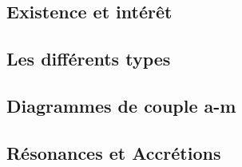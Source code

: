 \subsection{Existence et intérêt}
\subsection{Les différents types}\label{sec:CZ-types}
\subsection{Diagrammes de couple a-m}\label{sec:migrations-maps}
\subsection{Résonances et Accrétions}
